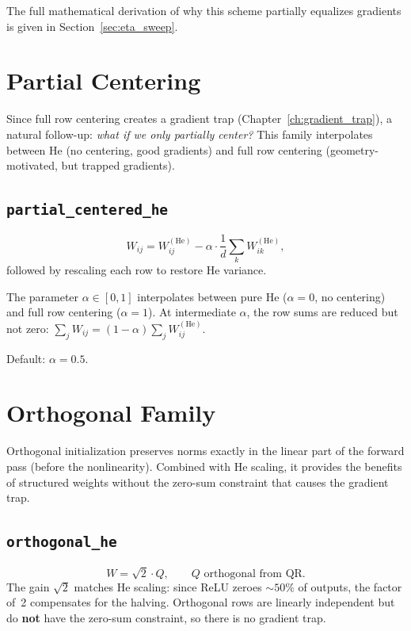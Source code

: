 The full mathematical derivation of why this scheme partially equalizes
gradients is given in Section~\ref{sec:eta_sweep}.

\section{Partial Centering}

\noindent
Since full row centering creates a gradient trap
(Chapter~\ref{ch:gradient_trap}), a natural follow-up:
\emph{what if we only partially center?}
This family interpolates between He (no centering, good gradients)
and full row centering (geometry-motivated, but trapped gradients).

\subsection{\texttt{partial\_centered\_he}}

\begin{equation}\label{eq:partial}
  W_{ij} = W_{ij}^{(\mathrm{He})}
           - \alpha \cdot \frac{1}{d}\sum_{k} W_{ik}^{(\mathrm{He})},
\end{equation}
followed by rescaling each row to restore He variance.

The parameter $\alpha \in [0,1]$ interpolates between pure He
($\alpha = 0$, no centering) and full row centering ($\alpha = 1$).
At intermediate $\alpha$, the row sums are reduced but not zero:
$\sum_j W_{ij} = (1-\alpha)\sum_j W_{ij}^{(\mathrm{He})}$.

Default: $\alpha = 0.5$.

\section{Orthogonal Family}
\label{sec:orthogonal_family}

\noindent
Orthogonal initialization preserves norms exactly in the linear part
of the forward pass (before the nonlinearity).  Combined with He
scaling, it provides the benefits of structured weights without the
zero-sum constraint that causes the gradient trap.

\subsection{\texttt{orthogonal\_he}}

\begin{equation}
  W = \sqrt{2} \cdot Q, \qquad Q \text{ orthogonal from QR}.
\end{equation}
The gain $\sqrt{2}$ matches He scaling: since ReLU zeroes ${\sim}50\%$
of outputs, the factor of~2 compensates for the halving.
Orthogonal rows are linearly independent but do \textbf{not} have
the zero-sum constraint, so there is no gradient trap.

